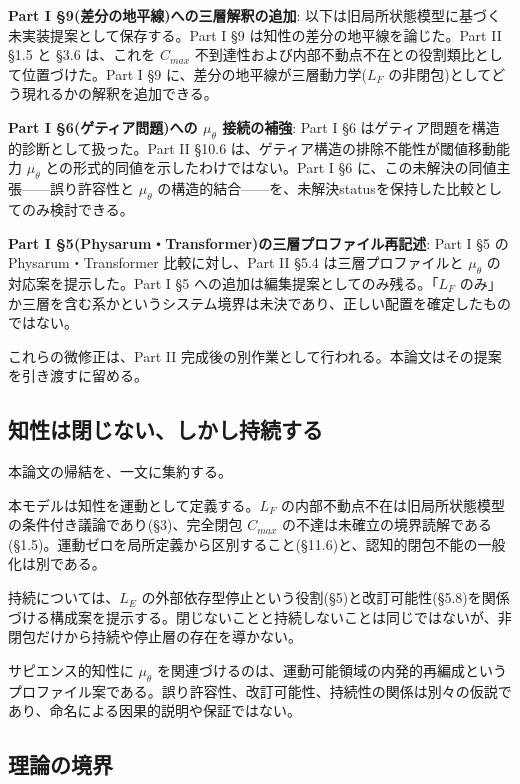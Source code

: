 \textbf{Part I \S{}9(差分の地平線)への三層解釈の追加}:
以下は旧局所状態模型に基づく未実装提案として保存する。Part I \S{}9 は知性の差分の地平線を論じた。Part II \S{}1.5 と \S{}3.6 は、これを $C_{max}$ 不到達性および内部不動点不在との役割類比として位置づけた。Part I \S{}9 に、差分の地平線が三層動力学($L_F$ の非閉包)としてどう現れるかの解釈を追加できる。

\textbf{Part I \S{}6(ゲティア問題)への $\mu_\theta$ 接続の補強}:
Part I \S{}6 はゲティア問題を構造的診断として扱った。Part II \S{}10.6 は、ゲティア構造の排除不能性が閾値移動能力 $\mu_\theta$ との形式的同値を示したわけではない。Part I \S{}6 に、この未解決の同値主張——誤り許容性と $\mu_\theta$ の構造的結合——を、未解決statusを保持した比較としてのみ検討できる。

\textbf{Part I \S{}5(Physarum・Transformer)の三層プロファイル再記述}:
Part I \S{}5 の Physarum・Transformer 比較に対し、Part II \S{}5.4 は三層プロファイルと $\mu_\theta$ の対応案を提示した。Part I \S{}5 への追加は編集提案としてのみ残る。「$L_F$ のみ」か三層を含む系かというシステム境界は未決であり、正しい配置を確定したものではない。

これらの微修正は、Part II 完成後の別作業として行われる。本論文はその提案を引き渡すに留める。

\bigskip


\subsection{知性は閉じない、しかし持続する}


本論文の帰結を、一文に集約する。

本モデルは知性を運動として定義する。$L_F$ の内部不動点不在は旧局所状態模型の条件付き議論であり(\S{}3)、完全閉包 $C_{max}$ の不達は未確立の境界読解である(\S{}1.5)。運動ゼロを局所定義から区別すること(\S{}11.6)と、認知的閉包不能の一般化は別である。

持続については、$L_E$ の外部依存型停止という役割(\S{}5)と改訂可能性(\S{}5.8)を関係づける構成案を提示する。閉じないことと持続しないことは同じではないが、非閉包だけから持続や停止層の存在を導かない。

サピエンス的知性に $\mu_\theta$ を関連づけるのは、運動可能領域の内発的再編成というプロファイル案である。誤り許容性、改訂可能性、持続性の関係は別々の仮説であり、命名による因果的説明や保証ではない。

\bigskip


\subsection{理論の境界}



